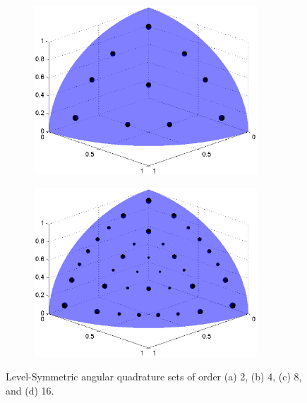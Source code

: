 \begin{figure}
\begin{subfigure}[b]{0.48\textwidth}
		\caption{}
	\end{subfigure}
	\vfill
	\begin{subfigure}[b]{0.48\textwidth}
		\centering
		\includegraphics[width=0.92\textwidth]{figures/sec_Sn/LS8_3D.eps}
		\caption{}
	\end{subfigure}
	\hfill
	\begin{subfigure}[b]{0.48\textwidth}
		\centering
		\includegraphics[width=0.92\textwidth]{figures/sec_Sn/LS16_3D.eps}
		\caption{}
	\end{subfigure}
\caption[3D Level-Symmetric angular quadrature set]{Level-Symmetric angular quadrature sets of order (a) 2, (b) 4, (c) 8, and (d) 16.}
\label{fig::Sn_Angle_LS_Quads_3D}
\end{figure}

